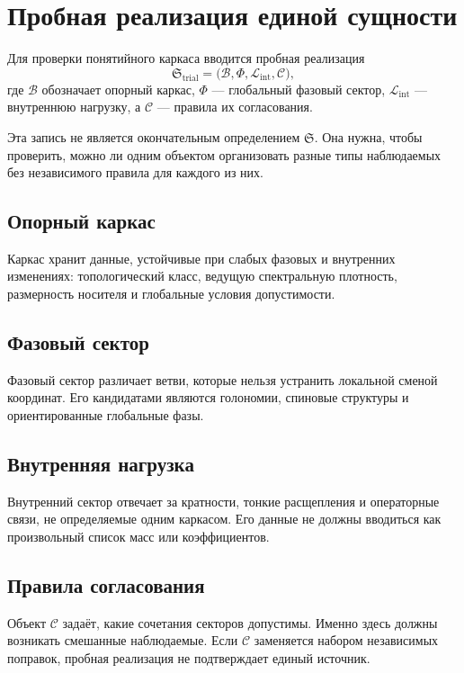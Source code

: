 \chapter{Пробная реализация единой сущности}

Для проверки понятийного каркаса вводится пробная реализация
\begin{equation}
 \mathfrak S_{\mathrm{trial}}=
 \bigl(\mathcal B,\Phi,\mathcal L_{\mathrm{int}},\mathcal C\bigr),
\end{equation}
где $\mathcal B$ обозначает опорный каркас, $\Phi$ --- глобальный фазовый
сектор, $\mathcal L_{\mathrm{int}}$ --- внутреннюю нагрузку, а $\mathcal C$ ---
правила их согласования.

Эта запись не является окончательным определением $\mathfrak S$. Она нужна,
чтобы проверить, можно ли одним объектом организовать разные типы наблюдаемых
без независимого правила для каждого из них.

\section{Опорный каркас}

Каркас хранит данные, устойчивые при слабых фазовых и внутренних изменениях:
топологический класс, ведущую спектральную плотность, размерность носителя и
глобальные условия допустимости.

\section{Фазовый сектор}

Фазовый сектор различает ветви, которые нельзя устранить локальной сменой
координат. Его кандидатами являются голономии, спиновые структуры и
ориентированные глобальные фазы.

\section{Внутренняя нагрузка}

Внутренний сектор отвечает за кратности, тонкие расщепления и операторные
связи, не определяемые одним каркасом. Его данные не должны вводиться как
произвольный список масс или коэффициентов.

\section{Правила согласования}

Объект $\mathcal C$ задаёт, какие сочетания секторов допустимы. Именно здесь
должны возникать смешанные наблюдаемые. Если $\mathcal C$ заменяется набором
независимых поправок, пробная реализация не подтверждает единый источник.


